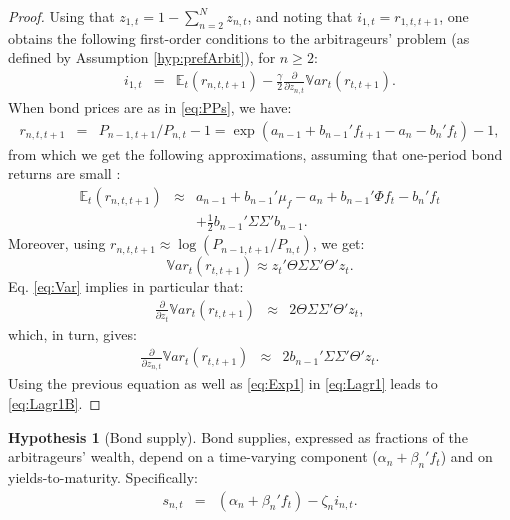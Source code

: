 \documentclass[
  12pt,
]{book}
\theoremstyle{definition}
\theoremstyle{definition}
\theoremstyle{definition}
\theoremstyle{definition}
\newtheorem{hypothesis}{Hypothesis}[chapter]
\theoremstyle{remark}
\begin{document}
\begin{proof}
Using that \(z_{1,t} = 1 - \sum_{n=2}^{N}z_{n,t}\), and noting that \(i_{1,t}=r_{1,t,t+1}\), one obtains the following first-order conditions to the arbitrageurs' problem (as defined by Assumption \ref{hyp:prefArbit}), for \(n \ge 2\):
\begin{eqnarray}
i_{1,t} &=& \mathbb{E}_t(r_{n,t,t+1}) - \frac{\gamma}{2} \frac{\partial}{\partial z_{n,t}} \mathbb{V}ar_t(r_{t,t+1}). \label{eq:Lagr1}
\end{eqnarray}
When bond prices are as in \eqref{eq:PPs}, we have:
\begin{eqnarray*}
r_{n,t,t+1} &=& P_{n-1,t+1}/P_{n,t}-1 = \exp(a_{n-1} + b_{n-1}'f_{t+1} - a_{n} - b_{n}'f_{t})-1,
\end{eqnarray*}
from which we get the following approximations, assuming that one-period bond returns are small \citep{Hamilton_Wu_2012}:
\begin{eqnarray}
\mathbb{E}_t(r_{n,t,t+1}) &\approx&  a_{n-1} + b_{n-1}'\mu_f  - a_{n} + b_{n-1}'\Phi f_t - b_{n}'f_{t}\nonumber\\
&&+ \frac{1}{2}b_{n-1}'\Sigma \Sigma'b_{n-1}. \label{eq:Exp1}
\end{eqnarray}
Moreover, using \(r_{n,t,t+1} \approx \log(P_{n-1,t+1}/P_{n,t})\), we get:
\begin{equation}
\mathbb{V}ar_t(r_{t,t+1}) \approx z_t'\Theta\Sigma\Sigma'\Theta' z_t.\label{eq:Var}
\end{equation}
Eq. \eqref{eq:Var} implies in particular that:
\begin{eqnarray*}
\frac{\partial}{\partial z_t} \mathbb{V}ar_t(r_{t,t+1}) &\approx& 2 \Theta\Sigma\Sigma'\Theta' z_t,
\end{eqnarray*}
which, in turn, gives:
\begin{eqnarray*}
\frac{\partial}{\partial z_{n,t}} \mathbb{V}ar_t(r_{t,t+1}) &\approx& 2 b_{n-1}'\Sigma\Sigma'\Theta' z_t.
\end{eqnarray*}
Using the previous equation as well as \eqref{eq:Exp1} in \eqref{eq:Lagr1} leads to \eqref{eq:Lagr1B}.
\end{proof}

\begin{hypothesis}[Bond supply]
\protect\hypertarget{hyp:supply}{}\label{hyp:supply}Bond supplies, expressed as fractions of the arbitrageurs' wealth, depend on a time-varying component (\(\alpha_n + \beta_n' f_t\)) and on yields-to-maturity. Specifically:
\begin{eqnarray}
s_{n,t} &=& (\alpha_n + {\beta_n}' f_t) - \zeta_n i_{n,t}. \label{eq:supply1}
\end{eqnarray}
\end{hypothesis}
\end{document}
